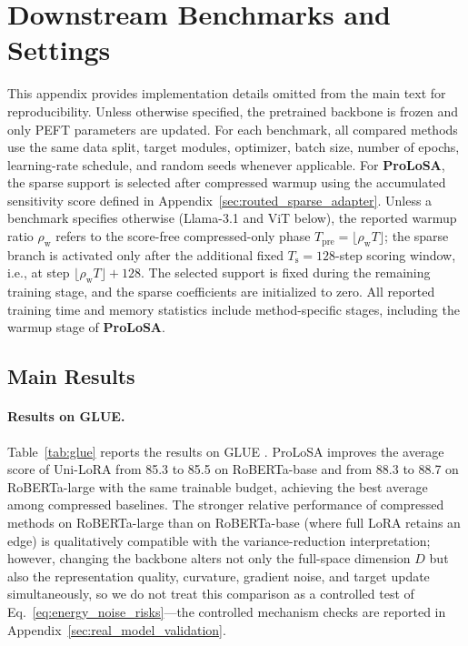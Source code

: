 \section{Downstream Benchmarks and Settings}
\label{app:downstream}
\label{app:exp_details}

This appendix provides implementation details omitted from the main text for reproducibility.
Unless otherwise specified, the pretrained backbone is frozen and only PEFT parameters are updated.
For each benchmark, all compared methods use the same data split, target modules, optimizer, batch size, number of epochs, learning-rate schedule, and random seeds whenever applicable.
For \textbf{ProLoSA}, the sparse support is selected after compressed warmup using the accumulated sensitivity score defined in Appendix~\ref{sec:routed_sparse_adapter}.
Unless a benchmark specifies otherwise (Llama-3.1 and ViT below), the reported warmup ratio $\rho_{\mathrm{w}}$ refers to the score-free compressed-only phase $T_{\mathrm{pre}}=\lfloor\rho_{\mathrm{w}}T\rfloor$; the sparse branch is activated only after the additional fixed $T_{\mathrm{s}}=128$-step scoring window, i.e., at step $\lfloor\rho_{\mathrm{w}}T\rfloor+128$.
The selected support is fixed during the remaining training stage, and the sparse coefficients are initialized to zero.
All reported training time and memory statistics include method-specific stages, including the warmup stage of \textbf{ProLoSA}.


\subsection{Main Results}

\paragraph{Results on GLUE.}
Table~\ref{tab:glue} reports the results on GLUE \citep{wang2018glue}. 
ProLoSA improves the average score of Uni-LoRA \citep{li2025unilora} from 85.3 to 85.5 on RoBERTa-base and from 88.3 to 88.7 on RoBERTa-large with the same trainable budget, achieving the best average among compressed baselines.
The stronger relative performance of compressed methods on RoBERTa-large than on RoBERTa-base (where full LoRA retains an edge) is qualitatively compatible with the variance-reduction interpretation; however, changing the backbone alters not only the full-space dimension $D$ but also the representation quality, curvature, gradient noise, and target update simultaneously, so we do not treat this comparison as a controlled test of Eq.~\eqref{eq:energy_noise_risks}---the controlled mechanism checks are reported in Appendix~\ref{sec:real_model_validation}.

